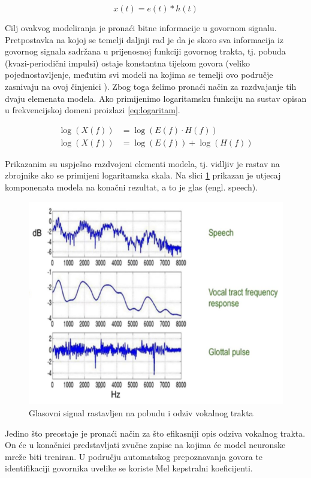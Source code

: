 \begin{equation}
    x(t) = e(t) \ast h(t)
    \label{eq:govor_vremenska}
\end{equation}

Cilj ovakvog modeliranja je pronaći bitne informacije u govornom signalu. Pretpostavka na
kojoj se temelji daljnji rad je da je skoro sva informacija iz govornog signala sadržana
u prijenosnoj funkciji govornog trakta, tj. pobuda (kvazi-periodični impulsi) ostaje
konstantna tijekom govora (veliko pojednostavljenje, međutim svi modeli na kojima
se temelji ovo područje zasnivaju na ovoj činjenici \cite{multiplier, emotion, sidhu2024mfcc}).
Zbog toga želimo pronaći način za 
razdvajanje tih dvaju elemenata modela. Ako primijenimo logaritamsku funkciju na
sustav opisan u frekvencijskoj domeni proizlazi \ref{eq:logaritam}.

\begin{equation}
    \label{eq:logaritam}
    \begin{aligned}
        \log(X(f)) &= \log(E(f) \cdot H(f)) \\
        \log(X(f)) &= \log(E(f)) + \log(H(f))
    \end{aligned}
\end{equation}

Prikazanim su uspješno razdvojeni elementi modela, tj. vidljiv je rastav na zbrojnike
ako se primijeni logaritamska skala. Na slici \ref{pic:rastav} prikazan je utjecaj
komponenata modela na konačni rezultat, a to je glas (engl. speech). 

\begin{figure}[htb]
    \centering
    \includegraphics[width=0.6\linewidth]{Chapters/struktura_sustava/generiranje_znacajki/log.png} 
    \caption{Glasovni signal rastavljen na pobudu i odziv vokalnog trakta \cite{sidhu2024mfcc}}
    \label{pic:rastav}
\end{figure}

Jedino što preostaje je pronaći način za što efikasniji opis odziva vokalnog trakta. On će
u konačnici predstavljati zvučne zapise na kojima će model neuronske mreže biti treniran.
U području automatskog prepoznavanja govora te identifikaciji govornika uvelike se koriste
Mel kepstralni koeficijenti. 


